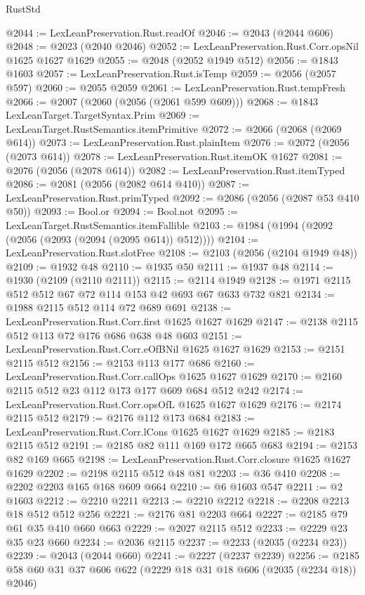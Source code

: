 \begin{lexlean}{RustStd}
\begin{coremodule}
@2044 := LexLeanPreservation.Rust.readOf
@2046 := @2043 (@2044 @606)
@2048 := @2023 (@2040 @2046)
@2052 := LexLeanPreservation.Rust.Corr.opsNil @1625 @1627 @1629
@2055 := @2048 (@2052 @1949 @512)
@2056 := @1843 @1603
@2057 := LexLeanPreservation.Rust.isTemp
@2059 := @2056 (@2057 @597)
@2060 := @2055 @2059
@2061 := LexLeanPreservation.Rust.tempFresh
@2066 := @2007 (@2060 (@2056 (@2061 @599 @609)))
@2068 := @1843 LexLeanTarget.TargetSyntax.Prim
@2069 := LexLeanTarget.RustSemantics.itemPrimitive
@2072 := @2066 (@2068 (@2069 @614))
@2073 := LexLeanPreservation.Rust.plainItem
@2076 := @2072 (@2056 (@2073 @614))
@2078 := LexLeanPreservation.Rust.itemOK @1627
@2081 := @2076 (@2056 (@2078 @614))
@2082 := LexLeanPreservation.Rust.itemTyped
@2086 := @2081 (@2056 (@2082 @614 @410))
@2087 := LexLeanPreservation.Rust.primTyped
@2092 := @2086 (@2056 (@2087 @53 @410 @50))
@2093 := Bool.or
@2094 := Bool.not
@2095 := LexLeanTarget.RustSemantics.itemFallible
@2103 := @1984 (@1994 (@2092 (@2056 (@2093 (@2094 (@2095 @614)) @512))))
@2104 := LexLeanPreservation.Rust.slotFree
@2108 := @2103 (@2056 (@2104 @1949 @48))
@2109 := @1932 @48
@2110 := @1935 @50
@2111 := @1937 @48
@2114 := @1930 (@2109 (@2110 @2111))
@2115 := @2114 @1949
@2128 := @1971 @2115 @512 @512 @67 @72 @114 @153 @42 @693 @67 @633 @732 @821
@2134 := @1988 @2115 @512 @114 @72 @689 @691
@2138 := LexLeanPreservation.Rust.Corr.first @1625 @1627 @1629
@2147 := @2138 @2115 @512 @113 @72 @176 @686 @638 @48 @603
@2151 := LexLeanPreservation.Rust.Corr.eOfBNil @1625 @1627 @1629
@2153 := @2151 @2115 @512
@2156 := @2153 @113 @177 @686
@2160 := LexLeanPreservation.Rust.Corr.callOps @1625 @1627 @1629
@2170 := @2160 @2115 @512 @23 @112 @173 @177 @609 @684 @512 @242
@2174 := LexLeanPreservation.Rust.Corr.opsOfL @1625 @1627 @1629
@2176 := @2174 @2115 @512
@2179 := @2176 @112 @173 @684
@2183 := LexLeanPreservation.Rust.Corr.lCons @1625 @1627 @1629
@2185 := @2183 @2115 @512
@2191 := @2185 @82 @111 @169 @172 @665 @683
@2194 := @2153 @82 @169 @665
@2198 := LexLeanPreservation.Rust.Corr.closure @1625 @1627 @1629
@2202 := @2198 @2115 @512 @48 @81
@2203 := @36 @410
@2208 := @2202 @2203 @165 @168 @609 @664
@2210 := @6 @1603 @547
@2211 := @2 @1603
@2212 := @2210 @2211
@2213 := @2210 @2212
@2218 := @2208 @2213 @18 @512 @512 @256
@2221 := @2176 @81 @2203 @664
@2227 := @2185 @79 @61 @35 @410 @660 @663
@2229 := @2027 @2115 @512
@2233 := @2229 @23 @35 @23 @660
@2234 := @2036 @2115
@2237 := @2233 (@2035 (@2234 @23))
@2239 := @2043 (@2044 @660)
@2241 := @2227 (@2237 @2239)
@2256 := @2185 @58 @60 @31 @37 @606 @622 (@2229 @18 @31 @18 @606 (@2035 (@2234 @18)) @2046)

\end{coremodule}
\end{lexlean}
